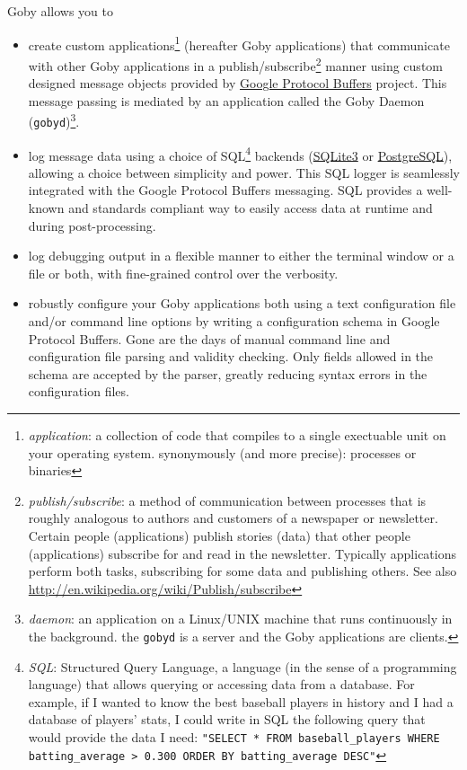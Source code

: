 \documentclass[11pt, letterpaper]{article}
\begin{document}
Goby allows you to
\begin{itemize}
\item create custom applications\footnote{\textit{application}: a collection of code that compiles to a single exectuable unit on your operating system. synonymously (and more precise): processes or binaries} (hereafter Goby applications) that communicate with other Goby applications in a publish/subscribe\footnote{\textit{publish/subscribe}: a method of communication between processes that is roughly analogous to authors and customers of a newspaper or newsletter. Certain people (applications) publish stories (data) that other people (applications) subscribe for and read in the newsletter. Typically applications perform both tasks, subscribing for some data and publishing others. See also \url{http://en.wikipedia.org/wiki/Publish/subscribe}} manner using custom designed message objects provided by \href{http://code.google.com/apis/protocolbuffers/}{Google Protocol Buffers} project. This message passing is mediated by an application called the Goby Daemon (\texttt{gobyd})\footnote{\textit{daemon}: an application on a Linux/UNIX machine that runs continuously in the background. the \texttt{gobyd} is a server and the Goby applications are clients.}.
\item log message data using a choice of SQL\footnote{\textit{SQL}: Structured Query Language, a language (in the sense of a programming language) that allows querying or accessing data from a database. For example, if I wanted to know the best baseball players in history and I had a database of players' stats, I could write in SQL the following query that would provide the data I need: \texttt{"SELECT * FROM baseball\_players WHERE batting\_average > 0.300 ORDER BY batting\_average DESC"}} backends (\href{http://www.sqlite.org/}{SQLite3} or \href{http://www.postgresql.org/}{PostgreSQL}), allowing a choice between simplicity and power. This SQL logger is seamlessly integrated with the Google Protocol Buffers messaging. SQL provides a well-known and standards compliant way to easily access data at runtime and during post-processing.
\item log debugging output in a flexible manner to either the terminal window or a file or both, with fine-grained control over the verbosity.
\item robustly configure your Goby applications both using a text configuration file and/or command line options by writing a configuration schema in Google Protocol Buffers. Gone are the days of manual command line and configuration file parsing and validity checking. Only fields allowed in the schema are accepted by the parser, greatly reducing syntax errors in the configuration files.
\end{itemize}
\end{document}
